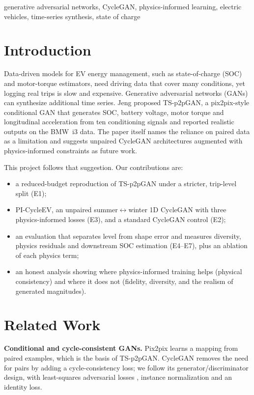 \documentclass[conference]{IEEEtran}
\begin{document}
\begin{IEEEkeywords}
generative adversarial networks, CycleGAN, physics-informed learning, electric vehicles, time-series synthesis, state of charge
\end{IEEEkeywords}

\section{Introduction}
Data-driven models for EV energy management, such as state-of-charge (SOC) and motor-torque estimators, need driving data that cover many conditions, yet logging real trips is slow and expensive. Generative adversarial networks (GANs) \cite{goodfellow2014gan} can synthesize additional time series. Jeng \cite{jeng2025} proposed TS-p2pGAN, a pix2pix-style conditional GAN \cite{isola2017pix2pix} that generates SOC, battery voltage, motor torque and longitudinal acceleration from ten conditioning signals and reported realistic outputs on the BMW~i3 data. The paper itself names the reliance on paired data as a limitation and suggests unpaired CycleGAN architectures \cite{zhu2017cyclegan} augmented with physics-informed constraints as future work.

This project follows that suggestion. Our contributions are:
\begin{itemize}
\item a reduced-budget reproduction of TS-p2pGAN under a stricter, trip-level split (E1);
\item PI-CycleEV, an unpaired summer$\leftrightarrow$winter 1D CycleGAN with three physics-informed losses (E3), and a standard CycleGAN control (E2);
\item an evaluation that separates level from shape error and measures diversity, physics residuals and downstream SOC estimation (E4--E7), plus an ablation of each physics term;
\item an honest analysis showing where physics-informed training helps (physical consistency) and where it does not (fidelity, diversity, and the realism of generated magnitudes).
\end{itemize}

\section{Related Work}
\textbf{Conditional and cycle-consistent GANs.} Pix2pix \cite{isola2017pix2pix} learns a mapping from paired examples, which is the basis of TS-p2pGAN. CycleGAN \cite{zhu2017cyclegan} removes the need for pairs by adding a cycle-consistency loss; we follow its generator/discriminator design, with least-squares adversarial losses \cite{mao2017lsgan}, instance normalization \cite{ulyanov2016instance} and an identity loss.
\end{document}

